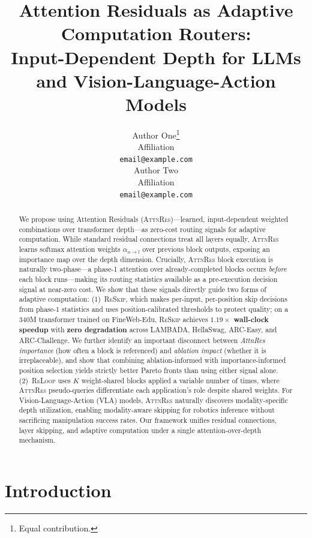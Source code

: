 \documentclass{article}
\title{Attention Residuals as Adaptive Computation Routers: \\
Input-Dependent Depth for LLMs and Vision-Language-Action Models}
\author{
  Author One\thanks{Equal contribution.} \\
  Affiliation \\
  \texttt{email@example.com} \\
  \And
  Author Two\footnotemark[1] \\
  Affiliation \\
  \texttt{email@example.com} \\
}
\newcommand{\attnres}{\textsc{AttnRes}}
\newcommand{\reskip}{\textsc{ReSkip}}
\newcommand{\reloop}{\textsc{ReLoop}}
\begin{document}
\maketitle

\begin{abstract}
We propose using Attention Residuals (\attnres{})---learned, input-dependent weighted combinations over transformer depth---as zero-cost routing signals for adaptive computation.
While standard residual connections treat all layers equally, \attnres{} learns softmax attention weights $\alpha_{n \to l}$ over previous block outputs, exposing an importance map over the depth dimension.
Crucially, \attnres{} block execution is naturally two-phase---a phase-1 attention over already-completed blocks occurs \emph{before} each block runs---making its routing statistics available as a pre-execution decision signal at near-zero cost.
We show that these signals directly guide two forms of adaptive computation:
(1)~\reskip{}, which makes per-input, per-position skip decisions from phase-1 statistics and uses position-calibrated thresholds to protect quality;
on a 340M transformer trained on FineWeb-Edu, \reskip{} achieves \textbf{$1.19\times$ wall-clock speedup} with \textbf{zero degradation} across LAMBADA, HellaSwag, ARC-Easy, and ARC-Challenge.
We further identify an important disconnect between \emph{AttnRes importance} (how often a block is referenced) and \emph{ablation impact} (whether it is irreplaceable), and show that combining ablation-informed with importance-informed position selection yields strictly better Pareto fronts than using either signal alone.
(2)~\reloop{} uses $K$ weight-shared blocks applied a variable number of times, where \attnres{} pseudo-queries differentiate each application's role despite shared weights.
For Vision-Language-Action (VLA) models, \attnres{} naturally discovers modality-specific depth utilization, enabling modality-aware skipping for robotics inference without sacrificing manipulation success rates.
Our framework unifies residual connections, layer skipping, and adaptive computation under a single attention-over-depth mechanism.
\end{abstract}

\section{Introduction}
\label{sec:intro}
\end{document}
